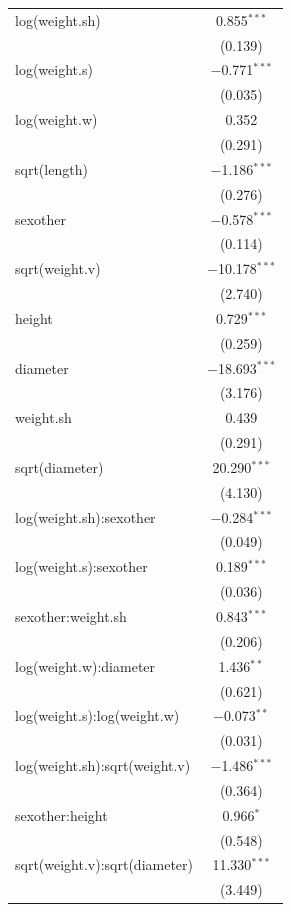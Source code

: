 \documentclass[12pt]{article}
\begin{document}
{\begin{longtable}{@{\extracolsep{5pt}}lc}
			log(weight.sh) & 0.855$^{***}$ \\ 
			& (0.139) \\[0.4ex]
			log(weight.s)  & $-$0.771$^{***}$ \\ 
			& (0.035) \\[0.4ex]
			log(weight.w)  & 0.352 \\ 
			& (0.291) \\[0.4ex]
			sqrt(length)   & $-$1.186$^{***}$ \\ 
			& (0.276) \\[0.4ex]
			sexother       & $-$0.578$^{***}$ \\ 
			& (0.114) \\[0.4ex]
			sqrt(weight.v) & $-$10.178$^{***}$ \\ 
			& (2.740) \\[0.4ex]
			height         & 0.729$^{***}$ \\ 
			& (0.259) \\[0.4ex]
			diameter       & $-$18.693$^{***}$ \\ 
			& (3.176) \\[0.4ex]
			weight.sh      & 0.439 \\ 
			& (0.291) \\[0.4ex]
			sqrt(diameter) & 20.290$^{***}$ \\ 
			& (4.130) \\[0.4ex]
			log(weight.sh):sexother & $-$0.284$^{***}$ \\ 
			& (0.049) \\[0.4ex]
			log(weight.s):sexother  & 0.189$^{***}$ \\ 
			& (0.036) \\[0.4ex]
			sexother:weight.sh      & 0.843$^{***}$ \\ 
			& (0.206) \\[0.4ex]
			log(weight.w):diameter  & 1.436$^{**}$ \\ 
			& (0.621) \\[0.4ex]
			log(weight.s):log(weight.w) & $-$0.073$^{**}$ \\ 
			& (0.031) \\[0.4ex]
			log(weight.sh):sqrt(weight.v) & $-$1.486$^{***}$ \\ 
			& (0.364) \\[0.4ex]
			sexother:height & 0.966$^{*}$ \\ 
			& (0.548) \\[0.4ex]
			sqrt(weight.v):sqrt(diameter) & 11.330$^{***}$ \\ 
			& (3.449) \\[0.4ex]

\end{longtable}}
\end{document}
